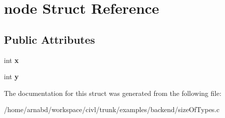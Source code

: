 \hypertarget{structnode}{}\section{node Struct Reference}
\label{structnode}
\subsection*{Public Attributes}
\begin{DoxyCompactItemize}
\item 
\hypertarget{structnode_a64dd8b65a7d38c632a017d7f36444dbb}{}int {\bfseries x}\label{structnode_a64dd8b65a7d38c632a017d7f36444dbb}

\item 
\hypertarget{structnode_ae944a3a75efb9856fa5c6f2221e2b49e}{}int {\bfseries y}\label{structnode_ae944a3a75efb9856fa5c6f2221e2b49e}

\end{DoxyCompactItemize}


The documentation for this struct was generated from the following file\+:\begin{DoxyCompactItemize}
\item 
/home/arnabd/workspace/civl/trunk/examples/backend/size\+Of\+Types.\+c\end{DoxyCompactItemize}
